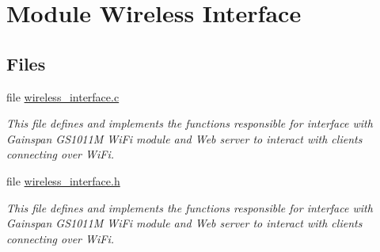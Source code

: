 \hypertarget{group__wireless__interface}{}\section{Module Wireless Interface}
\label{group__wireless__interface}
\subsection*{Files}
\begin{DoxyCompactItemize}
\item 
file \hyperlink{wireless__interface_8c}{wireless\+\_\+interface.\+c}
\begin{DoxyCompactList}\small\item\em This file defines and implements the functions responsible for interface with Gainspan G\+S1011M Wi\+Fi module and Web server to interact with clients connecting over Wi\+Fi. \end{DoxyCompactList}\item 
file \hyperlink{wireless__interface_8h}{wireless\+\_\+interface.\+h}
\begin{DoxyCompactList}\small\item\em This file defines and implements the functions responsible for interface with Gainspan G\+S1011M Wi\+Fi module and Web server to interact with clients connecting over Wi\+Fi. \end{DoxyCompactList}\end{DoxyCompactItemize}
